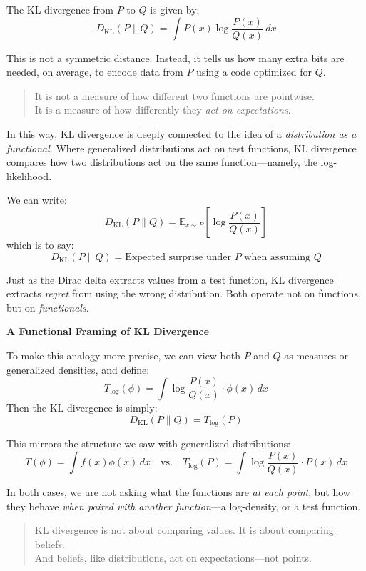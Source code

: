 The KL divergence from \( P \) to \( Q \) is given by:
\[
D_{\mathrm{KL}}(P \parallel Q) = \int P(x) \log \frac{P(x)}{Q(x)} \, dx
\]

This is not a symmetric distance. Instead, it tells us how many extra bits are needed, on average, to encode data from \( P \) using a code optimized for \( Q \).

\begin{quote}
It is not a measure of how different two functions are pointwise.\\
It is a measure of how differently they \emph{act on expectations}.
\end{quote}

In this way, KL divergence is deeply connected to the idea of a \textit{distribution as a functional}. Where generalized distributions act on test functions, KL divergence compares how two distributions act on the same function---namely, the log-likelihood.

We can write:
\[
D_{\mathrm{KL}}(P \parallel Q) = \mathbb{E}_{x \sim P} \left[ \log \frac{P(x)}{Q(x)} \right]
\]
which is to say:
\[
D_{\mathrm{KL}}(P \parallel Q) = \text{Expected surprise under } P \text{ when assuming } Q
\]

Just as the Dirac delta extracts values from a test function, KL divergence extracts \emph{regret} from using the wrong distribution. Both operate not on functions, but on \emph{functionals}.

\vspace{1em}
\noindent
\textbf{A Functional Framing of KL Divergence}

To make this analogy more precise, we can view both \( P \) and \( Q \) as measures or generalized densities, and define:
\[
T_{\log}(\phi) = \int \log \frac{P(x)}{Q(x)} \cdot \phi(x)\, dx
\]
Then the KL divergence is simply:
\[
D_{\mathrm{KL}}(P \parallel Q) = T_{\log}(P)
\]

This mirrors the structure we saw with generalized distributions:
\[
T(\phi) = \int f(x)\phi(x)\, dx
\quad \text{vs.} \quad
T_{\log}(P) = \int \log \frac{P(x)}{Q(x)} \cdot P(x)\, dx
\]

In both cases, we are not asking what the functions are \textit{at each point}, but how they behave \textit{when paired with another function}---a log-density, or a test function.

\begin{quote}
KL divergence is not about comparing values. It is about comparing beliefs.\\
And beliefs, like distributions, act on expectations---not points.
\end{quote}
